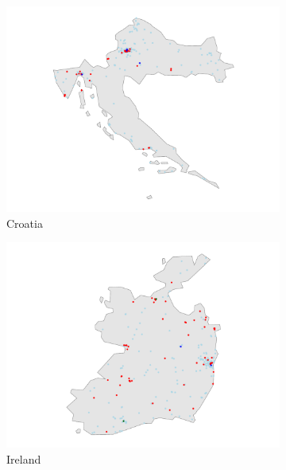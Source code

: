 \documentclass[12pt]{report}
\begin{document}
\begin{figure}[ht]
\begin{subfigure}[b]{0.45\textwidth}
        \centering
        \includegraphics[width=\linewidth]{../Output/HR_map.pdf}
        \caption{Croatia}
        \label{fig:map_obs_HR}
    \end{subfigure}
    \hfill
    \begin{subfigure}[b]{0.45\textwidth}
        \centering
        \includegraphics[width=\linewidth]{../Output/IE_map.pdf}
        \caption{Ireland}
        \label{fig:map_obs_IE}
    \end{subfigure}
    \vfill
    \begin{subfigure}[b]{0.45\textwidth}
        \centering

\end{subfigure}
\end{figure}
\end{document}
